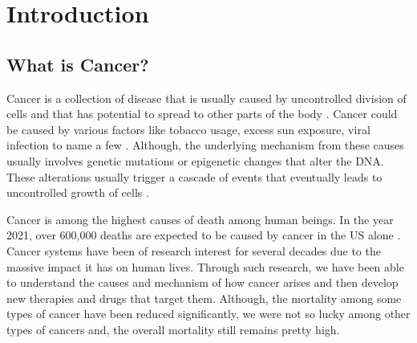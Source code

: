 \chapter{Introduction}

\section{What is Cancer?}
Cancer is a collection of disease that is usually caused by uncontrolled division of cells and that has potential to spread to other parts of the body \cite{cancergov}. Cancer could be caused by various factors like tobacco usage, excess sun exposure, viral infection to name a few \cite{Trichopoulos}. Although, the underlying mechanism from these causes usually involves genetic mutations or epigenetic changes that alter the DNA. These alterations usually trigger a cascade of events that eventually leads to uncontrolled growth of cells \cite{Moolgavkar,Gronbaek}.

Cancer is among the highest causes of death among human beings. In the year 2021, over 600,000 deaths are expected to be caused by cancer in the US alone \cite{cancer_stats}. Cancer systems have been of research interest for several decades due to the massive impact it has on human lives. Through such research, we have been able to understand the causes and mechanism of how cancer arises and then develop new therapies and drugs that target them. Although, the mortality among some types of cancer have been reduced significantly, we were not so lucky among other types of cancers and, the overall mortality still remains pretty high.

